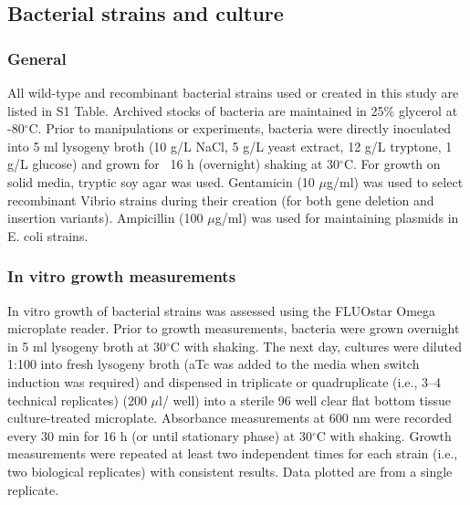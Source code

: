 \subsection{Bacterial strains and culture}

\subsubsection{General}
All wild-type and recombinant bacterial strains used or created in this study are listed in S1 Table. Archived stocks of bacteria are maintained in 25\% glycerol at -80$^\circ$C. Prior to manipulations or experiments, bacteria were directly inoculated into 5 ml lysogeny broth (10 g/L NaCl, 5 g/L yeast extract, 12 g/L tryptone, 1 g/L glucose) and grown for ~16 h (overnight) shaking at 30$^\circ$C. For growth on solid media, tryptic soy agar was used. Gentamicin (10 $\mu$g/ml) was used to select recombinant Vibrio strains during their creation (for both gene deletion and insertion variants). Ampicillin (100 $\mu$g/ml) was used for maintaining plasmids in E. coli strains. 

\subsubsection{In vitro growth measurements}
In vitro growth of bacterial strains was assessed using the FLUOstar Omega microplate reader. Prior to growth measurements, bacteria were grown overnight in 5 ml lysogeny broth at 30$^\circ$C with shaking. The next day, cultures were diluted 1:100 into fresh lysogeny broth (aTc was added to the media when switch induction was required) and dispensed in triplicate or quadruplicate (i.e., 3–4 technical replicates) (200 $\mu$l/ well) into a sterile 96 well clear flat bottom tissue culture-treated microplate. Absorbance measurements at 600 nm were recorded every 30 min for 16 h (or until stationary phase) at 30$^\circ$C with shaking. Growth measurements were repeated at least two independent times for each strain (i.e., two biological replicates) with consistent results. Data plotted are from a single replicate.

